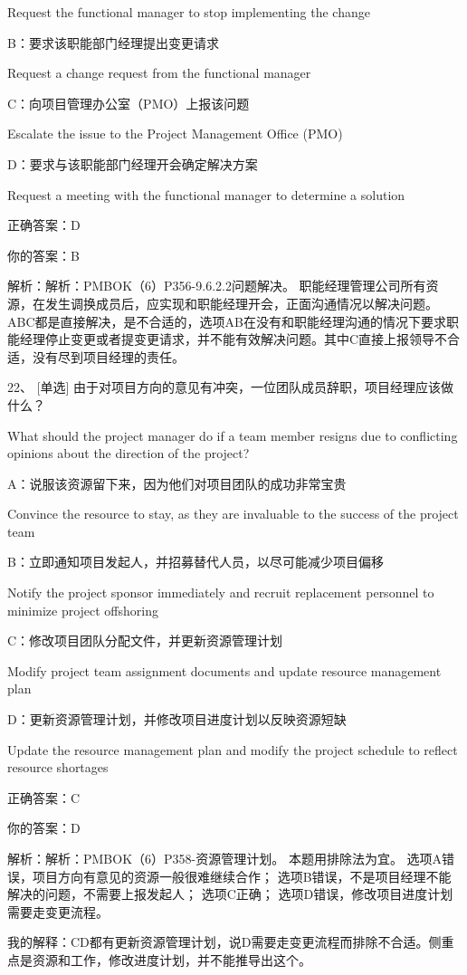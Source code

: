 Request the functional manager to stop implementing the change

B：要求该职能部门经理提出变更请求

Request a change request from the functional manager

C：向项目管理办公室（PMO）上报该问题

Escalate the issue to the Project Management Office (PMO)

D：要求与该职能部门经理开会确定解决方案

Request a meeting with the functional manager to determine a solution

正确答案：D

你的答案：B

解析：解析：PMBOK（6）P356-9.6.2.2问题解决。 职能经理管理公司所有资源，在发生调换成员后，应实现和职能经理开会，正面沟通情况以解决问题。ABC都是直接解决，是不合适的，选项AB在没有和职能经理沟通的情况下要求职能经理停止变更或者提变更请求，并不能有效解决问题。其中C直接上报领导不合适，没有尽到项目经理的责任。

22、 [单选] 由于对项目方向的意见有冲突，一位团队成员辞职，项目经理应该做什么？

What should the project manager do if a team member resigns due to conflicting opinions about the direction of the project?

A：说服该资源留下来，因为他们对项目团队的成功非常宝贵

Convince the resource to stay, as they are invaluable to the success of the project team

B：立即通知项目发起人，并招募替代人员，以尽可能减少项目偏移

Notify the project sponsor immediately and recruit replacement personnel to minimize project offshoring

C：修改项目团队分配文件，并更新资源管理计划

Modify project team assignment documents and update resource management plan

D：更新资源管理计划，并修改项目进度计划以反映资源短缺

Update the resource management plan and modify the project schedule to reflect resource shortages

正确答案：C

你的答案：D

解析：解析：PMBOK（6）P358-资源管理计划。 本题用排除法为宜。 选项A错误，项目方向有意见的资源一般很难继续合作； 选项B错误，不是项目经理不能解决的问题，不需要上报发起人； 选项C正确； 选项D错误，修改项目进度计划需要走变更流程。

我的解释：CD都有更新资源管理计划，说D需要走变更流程而排除不合适。侧重点是资源和工作，修改进度计划，并不能推导出这个。


